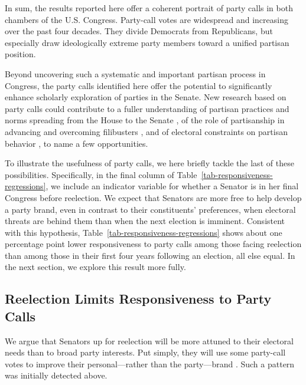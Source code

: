 \documentclass[12pt]{article}
\begin{document}
In sum, the results reported here offer a coherent portrait of party calls in both chambers of the U.S. Congress. Party-call votes are widespread and increasing over the past four decades. They divide Democrats from Republicans, but especially draw ideologically extreme party members toward a unified partisan position.

Beyond uncovering such a systematic and important partisan process in Congress, the party calls identified here offer the potential to significantly enhance scholarly exploration of parties in the Senate. New research based on party calls could contribute to a fuller understanding of partisan practices and norms spreading from the House to the Senate \citep[e.g.,][]{Theriault:2013}, of the role of partisanship in advancing and overcoming filibusters \citep[e.g.,][]{Wawro:2004}, and of electoral constraints on partisan behavior \citep[e.g.,][]{Levitt:1996}, to name a few opportunities.

To illustrate the usefulness of party calls, we here briefly tackle the last of these possibilities. Specifically, in the final column of Table~\ref{tab-responsiveness-regressions}, we include an indicator variable for whether a Senator is in her final Congress before reelection. We expect that Senators are more free to help develop a party brand, even in contrast to their constituents' preferences, when electoral threats are behind them than when the next election is imminent. Consistent with this hypothesis, Table~\ref{tab-responsiveness-regressions} shows about one percentage point lower responsiveness to party calls among those facing reelection than among those in their first four years following an election, all else equal. In the next section, we explore this result more fully.

\subsection*{Reelection Limits Responsiveness to Party Calls}

We argue that Senators up for reelection will be more attuned to their electoral needs than to broad party interests. Put simply, they will use some party-call votes to improve their personal---rather than the party---brand
\citep[e.g.,][]{Canes-Wrone:2002, Carson:2010}.  Such a pattern was initially detected above.
\end{document}
